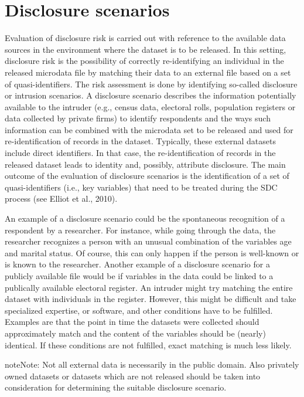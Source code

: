 \documentclass[letterpaper,10pt,english]{sphinxmanual}
\begin{document}
\section{Disclosure scenarios}
\label{\detokenize{measure_risk:disclosure-scenarios}}
Evaluation of disclosure risk is carried out with reference to the
available data sources in the environment where the dataset is to be
released. In this setting, disclosure risk is the possibility of
correctly re-identifying an individual in the released microdata file by
matching their data to an external file based on a set of
quasi-identifiers. The risk assessment is done by identifying so-called
disclosure or intrusion scenarios. A disclosure scenario describes the
information potentially available to the intruder (e.g., census data,
electoral rolls, population registers or data collected by private
firms) to identify respondents and the ways such information can be
combined with the microdata set to be released and used for
re-identification of records in the dataset. Typically, these external
datasets include direct identifiers. In that case, the re-identification
of records in the released dataset leads to identity and, possibly,
attribute disclosure. The main outcome of the evaluation of disclosure
scenarios is the identification of a set of quasi-identifiers (i.e., key
variables) that need to be treated during the SDC process (see Elliot et
al., 2010).

An example of a disclosure scenario could be the spontaneous recognition
of a respondent by a researcher. For instance, while going through the
data, the researcher recognizes a person with an unusual combination of
the variables age and marital status. Of course, this can only happen if
the person is well-known or is known to the researcher. Another example
of a disclosure scenario for a publicly available file would be if
variables in the data could be linked to a publically available
electoral register. An intruder might try matching the entire dataset
with individuals in the register. However, this might be difficult and
take specialized expertise, or software, and other conditions have to be
fulfilled. Examples are that the point in time the datasets were
collected should approximately match and the content of the variables
should be (nearly) identical. If these conditions are not fulfilled,
exact matching is much less likely.

\begin{sphinxadmonition}{note}{Note:}
Not all external data is
necessarily in the public domain. Also privately owned datasets or
datasets which are not released should be taken into consideration for
determining the suitable disclosure scenario.
\end{sphinxadmonition}
\end{document}
